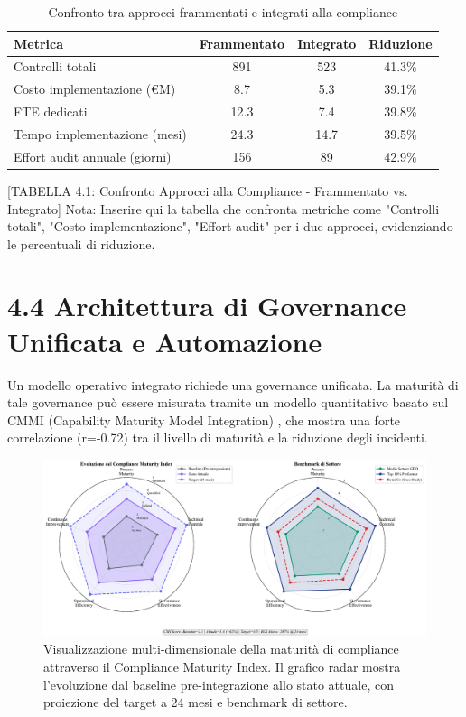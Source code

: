 \begin{refsection}
\begin{table}[h]
\centering
\caption{Confronto tra approcci frammentati e integrati alla compliance}
\label{tab:confronto_compliance}
\begin{tabular}{|l|c|c|c|}
\hline
\textbf{Metrica} & \textbf{Frammentato} & \textbf{Integrato} & \textbf{Riduzione} \\
\hline
Controlli totali & 891 & 523 & 41.3\% \\
Costo implementazione (€M) & 8.7 & 5.3 & 39.1\% \\
FTE dedicati & 12.3 & 7.4 & 39.8\% \\
Tempo implementazione (mesi) & 24.3 & 14.7 & 39.5\% \\
Effort audit annuale (giorni) & 156 & 89 & 42.9\% \\
\hline
\end{tabular}
\end{table}

[TABELLA 4.1: Confronto Approcci alla Compliance - Frammentato vs. Integrato]
Nota: Inserire qui la tabella che confronta metriche come "Controlli totali", "Costo implementazione", "Effort audit" per i due approcci, evidenziando le percentuali di riduzione.

\section{4.4 Architettura di Governance Unificata e Automazione}

Un modello operativo integrato richiede una governance unificata. La maturità di tale governance può essere misurata tramite un modello quantitativo basato sul CMMI (Capability Maturity Model Integration) \autocite{CMMI2023}, che mostra una forte correlazione (r=-0.72) tra il livello di maturità e la riduzione degli incidenti.

\begin{figure}[htbp]
\centering
\includegraphics[width=\textwidth]{thesis_figures/cap4/figura_4_2_cmi_radar.pdf}
\caption{Visualizzazione multi-dimensionale della maturità di compliance attraverso il Compliance Maturity Index. Il grafico radar mostra l'evoluzione dal baseline pre-integrazione allo stato attuale, con proiezione del target a 24 mesi e benchmark di settore.}
\label{fig:cmi_radar}
\end{figure}


\end{refsection}
